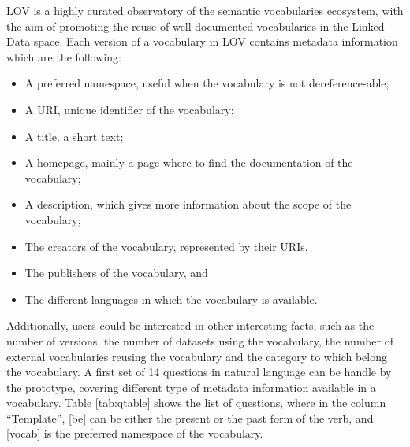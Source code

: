 \documentclass[runningheads,a4paper]{llncs}
\begin{document}
LOV is a highly curated observatory of the semantic vocabularies ecosystem, with the aim of promoting the reuse of well-documented vocabularies in the Linked Data space. Each version of a vocabulary in LOV contains metadata information which are the following:
\begin{itemize}
\item A preferred namespace, useful when the vocabulary is not dereference-able; 
\item A URI, unique identifier of the vocabulary;
\item A title, a short text; 
\item A homepage, mainly a page where to find the documentation of the vocabulary;
\item A description, which gives more information about the scope of the vocabulary;
\item The creators of the vocabulary, represented by their URIs.
\item The publishers of the vocabulary, and
\item The different languages in which the vocabulary is available.
\end{itemize}

Additionally, users could be interested in other interesting facts, such as the number of versions, the number of datasets  using the vocabulary, the number of external vocabularies reusing the vocabulary and the category to which belong the vocabulary. A first set of 14 questions in natural language can be handle by the prototype, covering different type of metadata information available in a vocabulary. Table \ref{tab:qtable} shows the list of questions, where in the column ``Template'', [be] can be either the present or the past form of the verb, and [vocab] is the preferred namespace of the vocabulary.    
\end{document}
